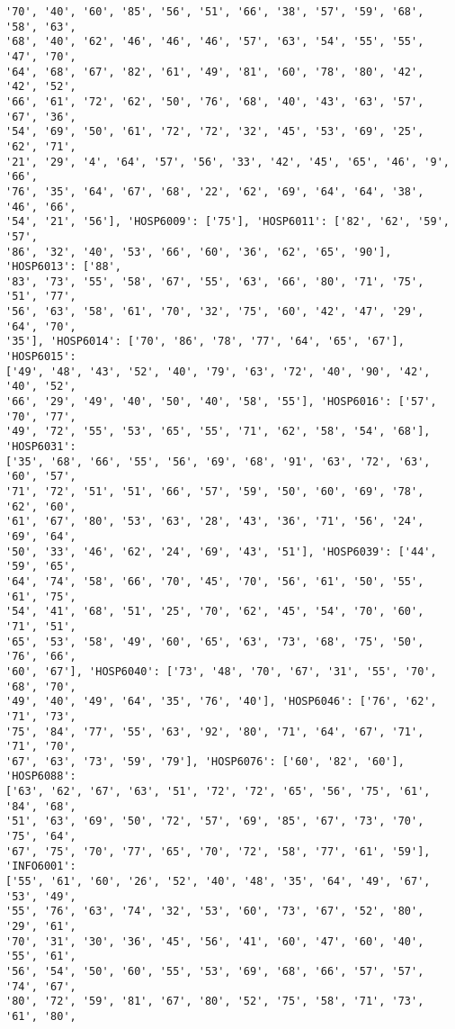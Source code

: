 \documentclass[11pt]{article}
\begin{document}
\begin{Verbatim}[commandchars=\\\{\}]
'70', '40', '60', '85', '56', '51', '66', '38', '57', '59', '68', '58', '63',
'68', '40', '62', '46', '46', '46', '57', '63', '54', '55', '55', '47', '70',
'64', '68', '67', '82', '61', '49', '81', '60', '78', '80', '42', '42', '52',
'66', '61', '72', '62', '50', '76', '68', '40', '43', '63', '57', '67', '36',
'54', '69', '50', '61', '72', '72', '32', '45', '53', '69', '25', '62', '71',
'21', '29', '4', '64', '57', '56', '33', '42', '45', '65', '46', '9', '66',
'76', '35', '64', '67', '68', '22', '62', '69', '64', '64', '38', '46', '66',
'54', '21', '56'], 'HOSP6009': ['75'], 'HOSP6011': ['82', '62', '59', '57',
'86', '32', '40', '53', '66', '60', '36', '62', '65', '90'], 'HOSP6013': ['88',
'83', '73', '55', '58', '67', '55', '63', '66', '80', '71', '75', '51', '77',
'56', '63', '58', '61', '70', '32', '75', '60', '42', '47', '29', '64', '70',
'35'], 'HOSP6014': ['70', '86', '78', '77', '64', '65', '67'], 'HOSP6015':
['49', '48', '43', '52', '40', '79', '63', '72', '40', '90', '42', '40', '52',
'66', '29', '49', '40', '50', '40', '58', '55'], 'HOSP6016': ['57', '70', '77',
'49', '72', '55', '53', '65', '55', '71', '62', '58', '54', '68'], 'HOSP6031':
['35', '68', '66', '55', '56', '69', '68', '91', '63', '72', '63', '60', '57',
'71', '72', '51', '51', '66', '57', '59', '50', '60', '69', '78', '62', '60',
'61', '67', '80', '53', '63', '28', '43', '36', '71', '56', '24', '69', '64',
'50', '33', '46', '62', '24', '69', '43', '51'], 'HOSP6039': ['44', '59', '65',
'64', '74', '58', '66', '70', '45', '70', '56', '61', '50', '55', '61', '75',
'54', '41', '68', '51', '25', '70', '62', '45', '54', '70', '60', '71', '51',
'65', '53', '58', '49', '60', '65', '63', '73', '68', '75', '50', '76', '66',
'60', '67'], 'HOSP6040': ['73', '48', '70', '67', '31', '55', '70', '68', '70',
'49', '40', '49', '64', '35', '76', '40'], 'HOSP6046': ['76', '62', '71', '73',
'75', '84', '77', '55', '63', '92', '80', '71', '64', '67', '71', '71', '70',
'67', '63', '73', '59', '79'], 'HOSP6076': ['60', '82', '60'], 'HOSP6088':
['63', '62', '67', '63', '51', '72', '72', '65', '56', '75', '61', '84', '68',
'51', '63', '69', '50', '72', '57', '69', '85', '67', '73', '70', '75', '64',
'67', '75', '70', '77', '65', '70', '72', '58', '77', '61', '59'], 'INFO6001':
['55', '61', '60', '26', '52', '40', '48', '35', '64', '49', '67', '53', '49',
'55', '76', '63', '74', '32', '53', '60', '73', '67', '52', '80', '29', '61',
'70', '31', '30', '36', '45', '56', '41', '60', '47', '60', '40', '55', '61',
'56', '54', '50', '60', '55', '53', '69', '68', '66', '57', '57', '74', '67',
'80', '72', '59', '81', '67', '80', '52', '75', '58', '71', '73', '61', '80',

\end{Verbatim}
\end{document}
